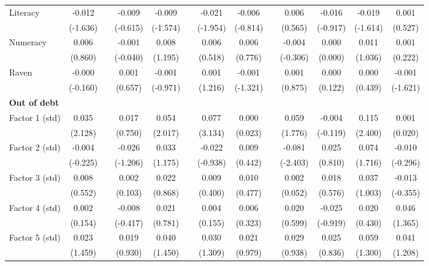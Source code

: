 \begin{table}[htbp]
{\begin{tabular}{lcccccccccccc}
    Literacy & -0.012 &   & -0.009 & -0.009 &   & \cellcolor[rgb]{ 1,  1,  0}-0.021 & -0.006 &   & 0.006 & -0.016 & -0.019 & 0.001 \\
      & (-1.636) &   & (-0.615) & (-1.574) &   & (-1.954) & (-0.814) &   & (0.565) & (-0.917) & (-1.614) & (0.527) \\
    Numeracy & 0.006 &   & -0.001 & 0.008 &   & 0.006 & 0.006 &   & -0.004 & 0.000 & 0.011 & 0.001 \\
      & (0.860) &   & (-0.040) & (1.195) &   & (0.518) & (0.776) &   & (-0.306) & (0.000) & (1.036) & (0.222) \\
    Raven & -0.000 &   & 0.001 & -0.001 &   & 0.001 & -0.001 &   & 0.001 & 0.000 & 0.000 & -0.001 \\
      & (-0.160) &   & (0.657) & (-0.971) &   & (1.216) & (-1.321) &   & (0.875) & (0.122) & (0.439) & (-1.621) \\
    \midrule
    \textbf{Out of debt} &   &   &   &   &   &   &   &   &   &   &   &  \\
    Factor 1 (std) & \cellcolor[rgb]{ 1,  1,  0}0.035 &   & 0.017 & \cellcolor[rgb]{ 1,  1,  0}0.054 &   & \cellcolor[rgb]{ 1,  1,  0}0.077 & 0.000 &   & \cellcolor[rgb]{ 1,  1,  0}0.059 & -0.004 & \cellcolor[rgb]{ 1,  1,  0}0.115 & 0.001 \\
      & (2.128) &   & (0.750) & (2.017) &   & (3.134) & (0.023) &   & (1.776) & (-0.119) & (2.400) & (0.020) \\
    Factor 2 (std) & -0.004 &   & -0.026 & 0.033 &   & -0.022 & 0.009 &   & \cellcolor[rgb]{ 1,  1,  0}-0.081 & 0.025 & 0.074 & -0.010 \\
      & (-0.225) &   & (-1.206) & (1.175) &   & (-0.938) & (0.442) &   & (-2.403) & (0.810) & (1.716) & (-0.296) \\
    Factor 3 (std) & 0.008 &   & 0.002 & 0.022 &   & 0.009 & 0.010 &   & 0.002 & 0.018 & 0.037 & -0.013 \\
      & (0.552) &   & (0.103) & (0.868) &   & (0.400) & (0.477) &   & (0.052) & (0.576) & (1.003) & (-0.355) \\
    Factor 4 (std) & 0.002 &   & -0.008 & 0.021 &   & 0.004 & 0.006 &   & 0.020 & -0.025 & 0.020 & 0.046 \\
      & (0.154) &   & (-0.417) & (0.781) &   & (0.155) & (0.323) &   & (0.599) & (-0.919) & (0.430) & (1.365) \\
    Factor 5 (std) & 0.023 &   & 0.019 & 0.040 &   & 0.030 & 0.021 &   & 0.029 & 0.025 & 0.059 & 0.041 \\
      & (1.459) &   & (0.930) & (1.450) &   & (1.309) & (0.979) &   & (0.938) & (0.836) & (1.300) & (1.208) \\

\end{tabular}}
\end{table}
